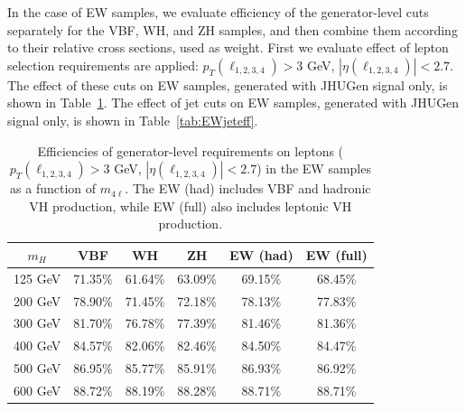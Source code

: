 In the case of EW \offshell samples, we evaluate efficiency of the generator-level cuts separately for
the VBF, WH, and ZH samples, and then combine them according to their relative cross sections, used as weight. 
First we evaluate effect of lepton selection requirements are applied:
\noindent $p_T(\ell_{1,2,3,4})> 3$ GeV, $|\eta(\ell_{1,2,3,4})| < 2.7$.
The effect of these cuts on EW samples, generated with JHUGen signal only, 
is shown in Table~\ref{tab:EWlepteff}.
The effect of jet cuts on EW samples, generated with JHUGen signal only, 
is shown in Table~\ref{tab:EWjeteff}.

\begin{table}[!hbt]
\begin{center}
\small
\begin{tabular}{|c|c|c|c|c|c|}
\hline
$m_H$ & VBF & WH  & ZH  & EW (had) & EW (full) \\ 
\hline
125 GeV  & 71.35\%    & 61.64\%    & 63.09\%    & 69.15\%     & 68.45\%              \\ 
200 GeV  & 78.90\%    & 71.45\%    & 72.18\%    & 78.13\%     & 77.83\%              \\ 
300 GeV  & 81.70\%    & 76.78\%    & 77.39\%    & 81.46\%     & 81.36\%              \\ 
400 GeV  & 84.57\%    & 82.06\%    & 82.46\%    & 84.50\%     & 84.47\%              \\  
500 GeV  & 86.95\%    & 85.77\%    & 85.91\%    & 86.93\%     & 86.92\%               \\  
600 GeV  & 88.72\%    & 88.19\%    & 88.28\%    & 88.71\%     & 88.71\%               \\  
\hline
\end{tabular}
\caption{
Efficiencies of generator-level requirements on leptons ($p_T(\ell_{1,2,3,4})> 3$ GeV, $|\eta(\ell_{1,2,3,4})| < 2.7$)
in the \offshell EW samples as a function of $m_{4\ell}$.
The EW (had) includes VBF and hadronic VH production, 
while EW (full) also includes leptonic VH production. 
}
\label{tab:EWlepteff}
\end{center}
\end{table}

